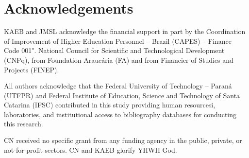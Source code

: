 \section*{Acknowledgements}

    KAEB and JMSL acknowledge the financial support in part by the Coordination  of  Improvement
    of Higher Education Personnel -- Brazil (CAPES) -- Finance Code 001". National  Council  for
    Scientific and Technological Development (CNPq), from Foundation  Araucária  (FA)  and  from
    Financier of Studies and Projects (FINEP).

    All authors acknowledge that the Federal University of  Technology  --  Paraná  (UTFPR)  and
    Federal Institute of Education, Science and Technology of Santa Catarina (IFSC)  contributed
    in this  study  providing  human  resourcesi,  laboratories,  and  institutional  access  to
    bibliography databases for conducting this research.

    CN received  no  specific  grant  from  any  funding  agency  in  the  public,  private,  or
    not-for-profit sectors. CN and KAEB glorify YHWH God.


